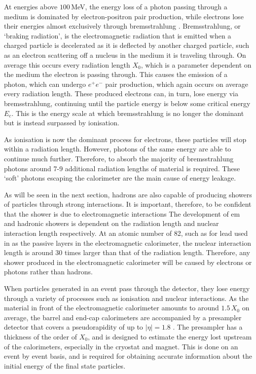 \documentclass{article}
\begin{document}
At energies above $100\,$MeV, the energy loss of a photon passing through a medium is dominated by electron-positron pair production, while electrons lose their energies almost exclusively through bremsstrahlung \cite{RPP}. 
Bremsstrahlung, or `braking radiation', is the electromagnetic radiation that is emitted when a charged particle is decelerated as it is deflected by another charged particle, such as an electron scattering off a nucleus in the medium it is traveling through. On average this occurs every radiation length $X_0$, which is a parameter dependent on the medium the electron is passing through. This causes the emission of a photon, which can undergo $e^+e^-$ pair production, which again occurs on average every radiation length. These produced electrons can, in turn, lose energy via bremsstrahlung, continuing until the particle energy is below some critical energy $E_c$. This is the energy scale at which bremsstrahlung is no longer the dominant but is instead surpassed by ionisation.

As ionisation is now the dominant process for electrons, these particles will stop within a radiation length. However, photons of the same energy are able to continue much further. Therefore, to absorb the majority of bremsstrahlung photons around 7-9 additional radiation lengths of material is required. These `soft' photons escaping the calorimeter are the main cause of energy leakage.

As will be seen in the next section, hadrons are also capable of producing showers of particles through strong interactions. It is important, therefore, to be confident that the shower is due to electromagnetic interactions
The development of em and hadronic showers is dependent on the radiation length and nuclear interaction length respectively. At an atomic number of 82, such as for lead used in as the passive layers in the electromagnetic calorimeter, the nuclear interaction length is around 30 times larger than that of the radiation length. Therefore, any shower produced in the electromagnetic calorimeter will be caused by electrons or photons rather than hadrons.

When particles generated in an event pass through the detector, they lose energy through a variety of processes such as ionisation and nuclear interactions.
As the material in front of the electromagnetic calorimeter amounts to around $1.5\,X_0$ on average, the barrel and end-cap calorimeters are accompanied by a presampler detector that covers a pseudorapidity of up to $|\eta| = 1.8$ \cite{EMCParticleIdentification}. The presampler has a thickness of the order of $X_0$, and is designed to estimate the energy lost upstream of the calorimeters, especially in the cryostat and magnet. This is done on an event by event basis, and is required for obtaining accurate information about the initial energy of the final state particles.
\end{document}

